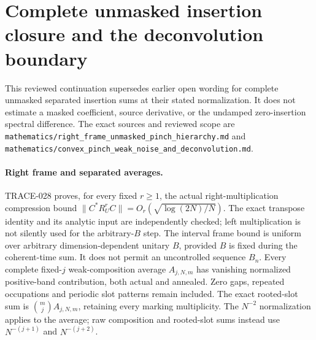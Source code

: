 \section{Complete unmasked insertion closure and the deconvolution boundary}
\label{sec:checked-unmasked-pinch-checkpoint}

This reviewed continuation supersedes earlier open wording for complete
unmasked separated insertion sums at their stated normalization. It does
not estimate a masked coefficient, source derivative, or the undamped
zero-insertion spectral difference. The exact sources and reviewed scope are
\texttt{mathematics/right\_frame\_unmasked\_pinch\_hierarchy.md} and
\texttt{mathematics/convex\_pinch\_weak\_noise\_and\_deconvolution.md}.

\paragraph{Right frame and separated averages.}
TRACE-028 proves, for every fixed $r\ge1$, the actual right-multiplication
compression bound $\|C^*R_U^rC\|=O_r(\sqrt{\log(2N)/N})$.
The exact transpose identity and its analytic input are independently checked;
left multiplication is not silently used for the arbitrary-$B$ step.
The interval frame bound is uniform over arbitrary dimension-dependent
unitary $B$, provided $B$ is fixed during the coherent-time sum. It does not
permit an uncontrolled sequence $B_n$.
Every complete fixed-$j$ weak-composition average $A_{j,N,m}$ has vanishing
normalized positive-band contribution, both actual and annealed. Zero gaps,
repeated occupations and periodic slot patterns remain included. The exact
rooted-slot sum is $\binom mj A_{j,N,m}$, retaining every marking multiplicity.
The $N^{-2}$ normalization applies to the average; raw composition and
rooted-slot sums instead use $N^{-(j+1)}$ and $N^{-(j+2)}$.


